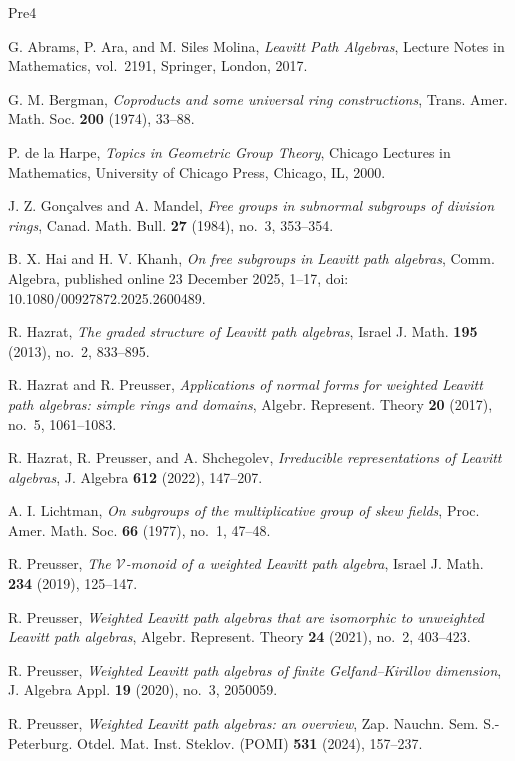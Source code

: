 \documentclass{article}
\theoremstyle{definition}
\begin{document}
\begin{thebibliography}{Pre4}

G. Abrams, P. Ara, and M. Siles Molina,
\emph{Leavitt Path Algebras},
Lecture Notes in Mathematics, vol.~2191,
Springer, London, 2017.

G. M. Bergman,
\emph{Coproducts and some universal ring constructions},
Trans. Amer. Math. Soc. \textbf{200} (1974), 33--88.

P. de la Harpe,
\emph{Topics in Geometric Group Theory},
Chicago Lectures in Mathematics,
University of Chicago Press, Chicago, IL, 2000.

J. Z. Gon\c{c}alves and A. Mandel,
\emph{Free groups in subnormal subgroups of division rings},
Canad. Math. Bull. \textbf{27} (1984), no.~3, 353--354.

B. X. Hai and H. V. Khanh,
\emph{On free subgroups in Leavitt path algebras},
Comm. Algebra, published online 23 December 2025, 1--17,
doi: 10.1080/00927872.2025.2600489.

R. Hazrat,
\emph{The graded structure of Leavitt path algebras},
Israel J. Math. \textbf{195} (2013), no.~2, 833--895.

R. Hazrat and R. Preusser,
\emph{Applications of normal forms for weighted Leavitt path algebras: simple rings and domains},
Algebr. Represent. Theory \textbf{20} (2017), no.~5, 1061--1083.

R. Hazrat, R. Preusser, and A. Shchegolev,
\emph{Irreducible representations of Leavitt algebras},
J. Algebra \textbf{612} (2022), 147--207.

A. I. Lichtman,
\emph{On subgroups of the multiplicative group of skew fields},
Proc. Amer. Math. Soc. \textbf{66} (1977), no.~1, 47--48.

R. Preusser,
\emph{The $\mathcal V$-monoid of a weighted Leavitt path algebra},
Israel J. Math. \textbf{234} (2019), 125--147.

R. Preusser,
\emph{Weighted Leavitt path algebras that are isomorphic to unweighted Leavitt path algebras},
Algebr. Represent. Theory \textbf{24} (2021), no.~2, 403--423.

R. Preusser,
\emph{Weighted Leavitt path algebras of finite Gelfand--Kirillov dimension},
J. Algebra Appl. \textbf{19} (2020), no.~3, 2050059.

R. Preusser,
\emph{Weighted Leavitt path algebras: an overview},
Zap. Nauchn. Sem. S.-Peterburg. Otdel. Mat. Inst. Steklov. (POMI)
\textbf{531} (2024), 157--237.


\end{thebibliography}
\end{document}
